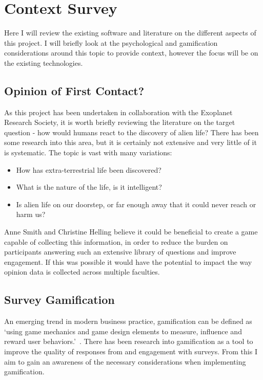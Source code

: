 \chapter{Context Survey}

Here I will review the existing software and literature on the different aspects of this project. 
I will briefly look at the psychological and gamification considerations around this topic to provide context, however the focus will be on the existing technologies.


\section{Opinion of First Contact?}
As this project has been undertaken in collaboration with the Exoplanet Research Society, it is worth briefly reviewing the literature on the target question - how would humans react to the discovery of alien life? There has been some research\cite{ReactionsToMessage, HowReactDiscovery, Fear} into this area, but it is certainly not extensive and very little of it is systematic. The topic is vast with many variations:
\begin{itemize}
    \item How has extra-terrestrial life been discovered?
    \item What is the nature of the life, is it intelligent?
    \item Is alien life on our doorstep, or far enough away that it could never reach or harm us?
\end{itemize}
Anne Smith and Christine Helling believe it could be beneficial to create a game capable of collecting this information, in order to reduce the burden on participants answering such an extensive library of questions and improve engagement. If this was possible it would have the potential to impact the way opinion data is collected across multiple faculties.

\section{Survey Gamification}
An emerging trend in modern business practice, gamification can be defined as `using game mechanics and game design elements to measure, influence and reward user behaviors.'~\cite{7804551}. 
There has been research into gamification as a tool to improve the quality of responses from and engagement with surveys. From this I aim to gain an awareness of the necessary considerations when implementing gamification.

